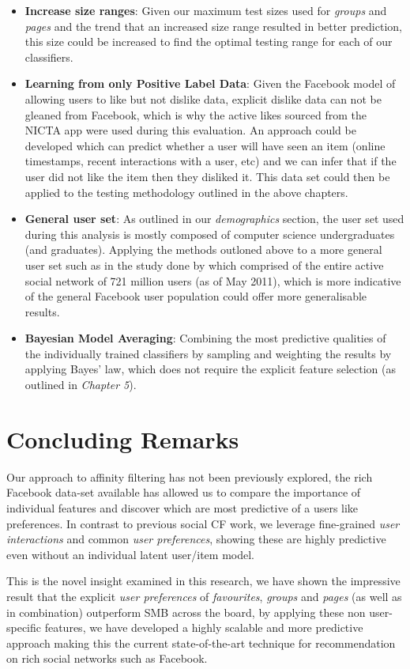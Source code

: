 \begin{itemize}
\item \textbf{Increase size ranges}: Given our maximum test sizes used for \emph{groups} and \emph{pages} and the trend that an increased
size range resulted in better prediction, this size could be 
increased to find the optimal testing range for each of our classifiers.
\item \textbf{Learning from only Positive Label Data}: Given the Facebook model of allowing users to like but not dislike data, explicit dislike data can not be 
gleaned from Facebook, which is why the active likes sourced from the NICTA app were used during this evaluation. An approach could be developed 
which can predict whether a user will have seen an item (online timestamps, recent interactions with a user, etc) and we can infer that if the 
user did not like the item then they disliked it. This data set could then be applied to the testing methodology outlined in the above chapters.
\item \textbf{General user set}: As outlined in our \emph{demographics} section, the user set used during this analysis is mostly composed of 
computer science undergraduates (and graduates). Applying the methods outloned above to a more general user set such as in the study done by \cite{jugand} which comprised of the entire active social network of 721 million users 
(as of May 2011), which is more indicative of the general Facebook user population could offer more 
generalisable results.
\item \textbf{Bayesian Model Averaging}: Combining the most predictive qualities of the individually trained classifiers by sampling and
weighting the results by applying Bayes' law, which does not require the explicit feature selection (as outlined in \emph{Chapter 5}).
\end{itemize}

\section{Concluding Remarks}
\label{sec:cr}
Our approach to affinity filtering has not been previously explored, the rich Facebook data-set available has allowed us to compare 
the importance of individual features and discover which are most predictive of a users like preferences. In contrast to previous social 
CF work, we leverage fine-grained \emph{user interactions} and common \emph{user preferences}, showing these are highly predictive 
even without an individual latent user/item model.

This is the novel insight examined in this research, we have shown the impressive result that the explicit \emph{user preferences} of
\emph{favourites}, \emph{groups} and \emph{pages} (as well as in combination) outperform SMB across the board, by 
applying these non user-specific features, we have developed a highly scalable and more predictive approach 
making this the current state-of-the-art technique for recommendation on rich social networks such as Facebook.

